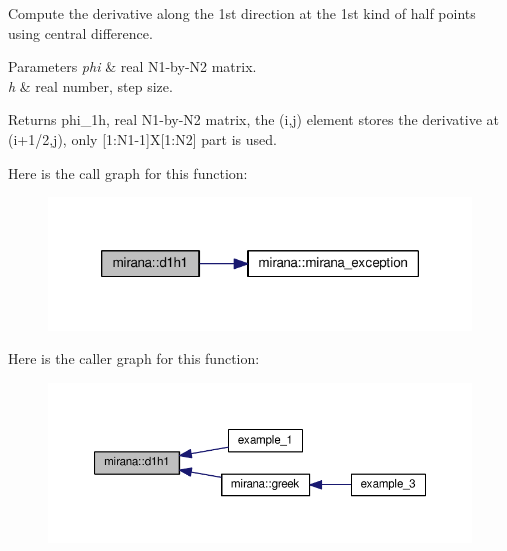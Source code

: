 Compute the derivative along the 1st direction at the 1st kind of half points using central difference. 


\begin{DoxyParams}{Parameters}
{\em phi} & real N1-\/by-\/\-N2 matrix. \\
\hline
{\em h} & real number, step size. \\
\hline
\end{DoxyParams}
\begin{DoxyReturn}{Returns}
phi\-\_\-1h, real N1-\/by-\/\-N2 matrix, the (i,j) element stores the derivative at (i+1/2,j), only \mbox{[}1\-:N1-\/1\mbox{]}X\mbox{[}1\-:N2\mbox{]} part is used. 
\end{DoxyReturn}


Here is the call graph for this function\-:\nopagebreak
\begin{figure}[H]
\begin{center}
\leavevmode
\includegraphics[width=318pt]{classmirana_acc84c99770972f6328e89ac04ac67153_cgraph}
\end{center}
\end{figure}




Here is the caller graph for this function\-:
\nopagebreak
\begin{figure}[H]
\begin{center}
\leavevmode
\includegraphics[width=350pt]{classmirana_acc84c99770972f6328e89ac04ac67153_icgraph}
\end{center}
\end{figure}


